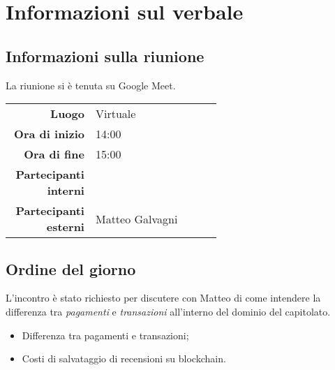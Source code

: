 \section{Informazioni sul verbale}

\subsection{Informazioni sulla riunione}
La riunione si è tenuta su Google Meet.
\begin{center}
	\begin{tabular}{r|p{0.6\linewidth}}
		\toprule
		\textbf{Luogo} & Virtuale \\
		\textbf{Ora di inizio} & 14:00 \\
		\textbf{Ora di fine} & 15:00 \\
		\textbf{Partecipanti interni} & \groupTeam \\
		\textbf{Partecipanti esterni} & Matteo Galvagni
	\end{tabular}
\end{center}

\medskip

\subsection{Ordine del giorno}
L'incontro è stato richiesto per discutere con Matteo di come intendere la differenza tra \textit{pagamenti}  e \textit{transazioni} all'interno del dominio del capitolato. 

\begin{itemize}
	\item Differenza tra pagamenti e transazioni;
	\item Costi di salvataggio di recensioni su blockchain.
\end{itemize}
